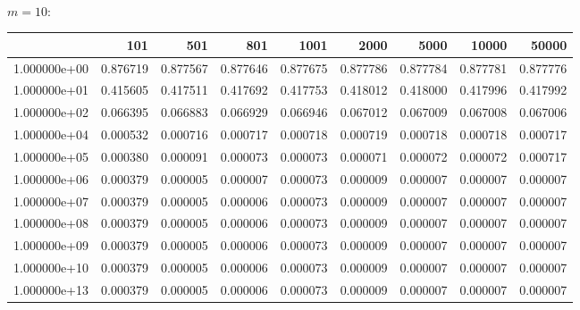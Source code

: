 \documentclass[11pt,a4paper]{report}
\begin{document}
\\
$m=10$:
\\
\begin{tabular}{lrrrrrrrr}
\toprule
{} &     101   &     501   &     801   &     1001  &     2000  &     5000  &     10000 &     50000 \\
\midrule
1.000000e+00 &  0.876719 &  0.877567 &  0.877646 &  0.877675 &  0.877786 &  0.877784 &  0.877781 &  0.877776 \\
1.000000e+01 &  0.415605 &  0.417511 &  0.417692 &  0.417753 &  0.418012 &  0.418000 &  0.417996 &  0.417992 \\
1.000000e+02 &  0.066395 &  0.066883 &  0.066929 &  0.066946 &  0.067012 &  0.067009 &  0.067008 &  0.067006 \\
1.000000e+04 &  0.000532 &  0.000716 &  0.000717 &  0.000718 &  0.000719 &  0.000718 &  0.000718 &  0.000717 \\
1.000000e+05 &  0.000380 &  0.000091 &  0.000073 &  0.000073 &  0.000071 &  0.000072 &  0.000072 &  0.000717 \\
1.000000e+06 &  0.000379 &  0.000005 &  0.000007 &  0.000073 &  0.000009 &  0.000007 &  0.000007 &  0.000007 \\
1.000000e+07 &  0.000379 &  0.000005 &  0.000006 &  0.000073 &  0.000009 &  0.000007 &  0.000007 &  0.000007 \\
1.000000e+08 &  0.000379 &  0.000005 &  0.000006 &  0.000073 &  0.000009 &  0.000007 &  0.000007 &  0.000007 \\
1.000000e+09 &  0.000379 &  0.000005 &  0.000006 &  0.000073 &  0.000009 &  0.000007 &  0.000007 &  0.000007 \\
1.000000e+10 &  0.000379 &  0.000005 &  0.000006 &  0.000073 &  0.000009 &  0.000007 &  0.000007 &  0.000007 \\
1.000000e+13 &  0.000379 &  0.000005 &  0.000006 &  0.000073 &  0.000009 &  0.000007 &  0.000007 &  0.000007 \\
\bottomrule
\end{tabular}
\\
\end{document}
